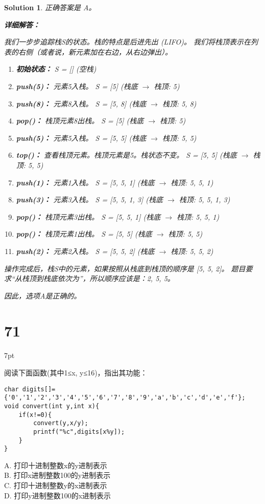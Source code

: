 \documentclass[UTF8]{report}
\newtheorem{solution}{Solution}
\theoremstyle{MyLineTheoremStyle} %
\theoremstyle{MyBlockTheoremStyle} %
\theoremstyle{MySubsubsectionStyle} %
\newenvironment{graybox}{%
        \def\FrameCommand{%
        \hspace{1pt}%
        {\color{gray}\small \vrule width 2pt}%
        {\color{graybox_color}\vrule width 4pt}%
        \colorbox{graybox_color}%
        }%
        \MakeFramed{\advance\hsize-\width\FrameRestore}%
        \noindent\hspace{-4.55pt}%
        \begin{adjustwidth}{}{7pt}%
        \vspace{2pt}\vspace{2pt}%
        }
        {%
        \vspace{2pt}\end{adjustwidth}\endMakeFramed%
        }
\begin{document}
\begin{solution}
正确答案是 A。

\textbf{详细解答：}

我们一步步追踪栈S的状态。栈的特点是后进先出 (LIFO)。
我们将栈顶表示在列表的右侧（或者说，新元素加在右边，从右边弹出）。
\begin{enumerate}
    \item \textbf{初始状态：} S = [] (空栈)
    \item \textbf{push(5)：} 元素5入栈。
          S = [5]
          (栈底 $\rightarrow$ 栈顶: 5)
    \item \textbf{push(8)：} 元素8入栈。
          S = [5, 8]
          (栈底 $\rightarrow$ 栈顶: 5, 8)
    \item \textbf{pop()：} 栈顶元素8出栈。
          S = [5]
          (栈底 $\rightarrow$ 栈顶: 5)
    \item \textbf{push(5)：} 元素5入栈。
          S = [5, 5]
          (栈底 $\rightarrow$ 栈顶: 5, 5)
    \item \textbf{top()：} 查看栈顶元素。栈顶元素是5。栈状态不变。
          S = [5, 5]
          (栈底 $\rightarrow$ 栈顶: 5, 5)
    \item \textbf{push(1)：} 元素1入栈。
          S = [5, 5, 1]
          (栈底 $\rightarrow$ 栈顶: 5, 5, 1)
    \item \textbf{push(3)：} 元素3入栈。
          S = [5, 5, 1, 3]
          (栈底 $\rightarrow$ 栈顶: 5, 5, 1, 3)
    \item \textbf{pop()：} 栈顶元素3出栈。
          S = [5, 5, 1]
          (栈底 $\rightarrow$ 栈顶: 5, 5, 1)
    \item \textbf{pop()：} 栈顶元素1出栈。
          S = [5, 5]
          (栈底 $\rightarrow$ 栈顶: 5, 5)
    \item \textbf{push(2)：} 元素2入栈。
          S = [5, 5, 2]
          (栈底 $\rightarrow$ 栈顶: 5, 5, 2)
\end{enumerate}

操作完成后，栈S中的元素，如果按照从栈底到栈顶的顺序是 [5, 5, 2]。
题目要求“从栈顶到栈底依次为”，所以顺序应该是：2, 5, 5。

因此，选项A是正确的。
\end{solution}



\section*{71}
\begin{graybox}
阅读下面函数(其中1≤x, y≤16)，指出其功能：
\begin{lstlisting}
char digits[]={'0','1','2','3','4','5','6','7','8','9','a','b','c','d','e','f'};
void convert(int y,int x){
    if(x!=0){
        convert(y,x/y);
        printf("%c",digits[x%y]);
    }
}
\end{lstlisting}
A. 打印十进制整数x的y进制表示 \\
B. 打印x进制整数100的y进制表示 \\
C. 打印十进制整数y的x进制表示 \\
D. 打印y进制整数100的x进制表示
\end{graybox}
\end{document}
